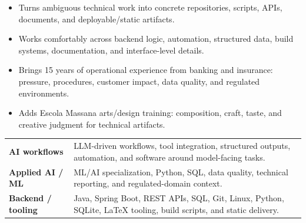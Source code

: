 \documentclass[a4paper,10pt]{article}
\begin{document}
\begin{minipage}[t][\BodyHeight]{\MainWidth}
    \begin{itemize}
      \item Turns ambiguous technical work into concrete repositories, scripts,
        APIs, documents, and deployable/static artifacts.
      \item Works comfortably across backend logic, automation, structured data,
        build systems, documentation, and interface-level details.
      \item Brings 15 years of operational experience from banking and
        insurance: pressure, procedures, customer impact, data quality, and
        regulated environments.
      \item Adds Escola Massana arts/design training: composition, craft, taste,
        and creative judgment for technical artifacts.
    \end{itemize}

    \cvEducation

    \begin{tabularx}{\linewidth}{L{2.55cm} Y}
      \textbf{AI workflows}
        & LLM-driven workflows, tool integration, structured outputs,
          automation, and software around model-facing tasks.\\
      \textbf{Applied AI / ML}
        & ML/AI specialization, Python, SQL, data quality, technical reporting,
          and regulated-domain context.\\
      \textbf{Backend / tooling}
        & Java, Spring Boot, REST APIs, SQL, Git, Linux, Python, SQLite,
          LaTeX tooling, build scripts, and static delivery.\\
    \end{tabularx}
  \end{minipage}

  \cvParserSummary
\end{document}
